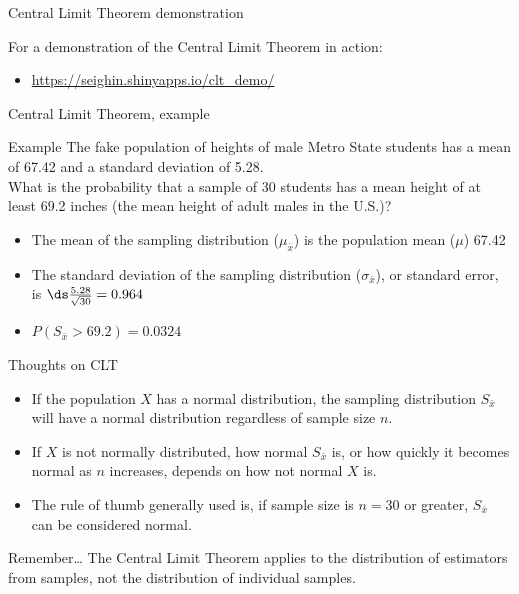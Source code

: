 \documentclass[xcolor=table, aspectratio=169, bigger]{beamer}
\begin{document}
\begin{frame}{Central Limit Theorem demonstration}
\begin{block}{}
For a demonstration of the Central Limit Theorem in action:
\begin{itemize}
\item \url{https://seighin.shinyapps.io/clt_demo/}
\end{itemize}
\end{block}
\end{frame}

\begin{frame}{Central Limit Theorem, example}
\begin{exampleblock}{Example}
The fake population of heights of male Metro State students has a mean of 67.42 and a standard deviation of 5.28. \\
\medskip
What is the probability that a sample of 30 students has a mean height of at least 69.2 inches (the mean height of adult males in the U.S.)?\\ \medskip

\begin{itemize}
\pause\item The mean of the sampling distribution ($\mu_{\bar x}$) is the population mean ($\mu$) 67.42
\pause\item The standard deviation of the sampling distribution ($\sigma_{\bar x}$), or standard error, is $\ds \frac {5.28}{\sqrt{30}} = 0.964$  
\pause\item $P(S_{\bar x} > 69.2) = 0.0324$
\end{itemize}
\end{exampleblock}

\end{frame}

\begin{frame}{Thoughts on CLT}
\begin{block}{}
\begin{itemize}
\item If the population $X$ has a normal distribution, the sampling distribution $S_{\bar x}$ will have a normal distribution regardless of sample size $n$.
\pause\item If $X$ is not normally distributed, how normal $S_{\bar x}$ is, or how quickly it becomes normal as $n$ increases, depends on how not normal $X$ is.
\pause\item The rule of thumb generally used is, if sample size is $n=30$ or greater, $S_{\bar x}$ can be considered normal.
\end{itemize}

\end{block}

\pause
\begin{alertblock}{Remember\ldots}
The Central Limit Theorem applies to the distribution of estimators from samples, not the distribution of individual samples.
\end{alertblock}
\end{frame}
\end{document}

